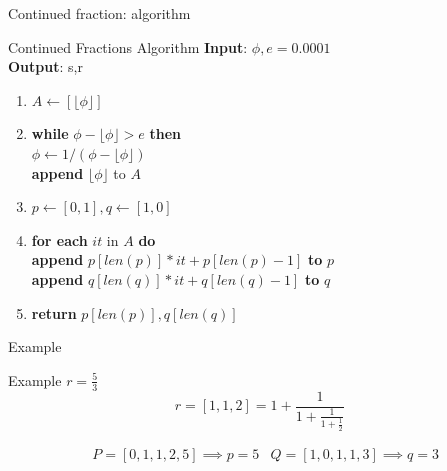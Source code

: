 \documentclass{beamer}
\begin{document}
    \begin{frame}{Continued fraction: algorithm}
        \begin{alertblock}{Continued Fractions Algorithm}
            \textbf{Input}: $\phi, e = 0.0001$ \\
            \textbf{Output}: s,r
            \vspace{0.5cm}
            \begin{enumerate}
                \item $A \leftarrow [\lfloor \phi \rfloor]$
                \item \textbf{while} $\phi - \lfloor \phi \rfloor > e$ \textbf{then} \\ \hspace{0.5cm} $\phi \leftarrow 1/ (\phi - \lfloor \phi \rfloor)$ \\ \hspace{0.5cm} \textbf{append} $\lfloor \phi \rfloor$ to $A$
                \item $p \leftarrow [0,1], q \leftarrow [1,0]$
                \item \textbf{for each} $it$ in $A$ \textbf{do} \\ 
                    \hspace{0.5cm} \textbf{append} $p[len(p)] * it + p[len(p) - 1]$ \textbf{to} $p$ \\
                    \hspace{0.5cm} \textbf{append} $q[len(q)] * it + q[len(q) - 1]$ \textbf{to} $q$
                \item \textbf{return} $p[len(p)], q[len(q)]$
                
            \end{enumerate}
        \end{alertblock}
    \end{frame}

    \begin{frame}{Example}
        \begin{exampleblock}{Example $r = \frac{5}{3}$}
            $$r = [1,1,2] = 1 + \frac{1}{1 + \frac{1}{1 + \frac{1}{2}}}$$

            \begin{align*}
                &P= [0, 1, 1, 2, 5] \implies p = 5 &Q= [1, 0, 1, 1, 3] \implies q = 3
            \end{align*}
        \end{exampleblock}
    \end{frame}
\end{document}
